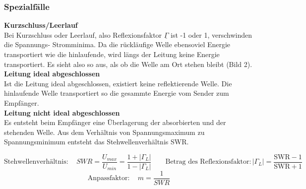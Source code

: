 	\subsubsection{Spezialfälle}
		\textbf{Kurzschluss/Leerlauf}\\
			Bei Kurzschluss oder Leerlauf, also Reflexionsfaktor $\underline{\Gamma}$ ist -1 oder 1, verschwinden die Spannungs- Stromminima.
			Da die rückläufige Welle ebensoviel Energie transportiert wie die hinlaufende, wird längs der Leitung keine Energie transportiert.
			Es sieht also so aus, als ob die Welle am Ort stehen bleibt (Bild 2).\\
		\textbf{Leitung ideal abgeschlossen}\\
			Ist die Leitung ideal abgeschlossen, existiert keine reflektierende Welle.
			Die hinlaufende Welle transportiert so die gesammte Energie vom Sender zum Empfänger.\\
		\textbf{Leitung nicht ideal abgeschlossen}\\
			Es entsteht beim Empfänger eine Überlagerung der absorbierten und der stehenden Welle.
			Aus dem Verhältnis von Spannungsmaximum zu Spannungsminimum entsteht das Stehwellenverhältnis SWR.
			
			$$\text{Stehwellenverhältnis}: \quad SWR=\frac{U_{max}}{U_{min}}=\frac{1+|\Gamma_L|}{1-|\Gamma_L|} \qquad \text{Betrag des Reflexionsfaktor}:|\Gamma_L|=\frac{\text{SWR} -1}{\text{SWR} +1}$$
			$$\text{Anpassfaktor}: \quad m=\frac{1}{SWR}$$
